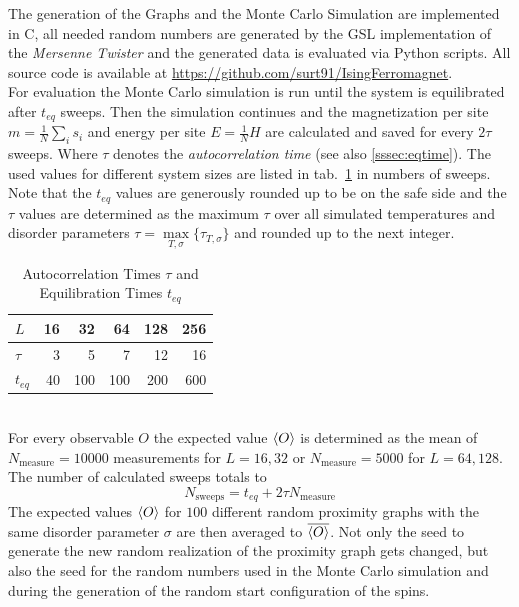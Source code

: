 The generation of the Graphs and the Monte Carlo Simulation are implemented
in C, all needed random numbers are generated by the GSL \cite{GSL}
implementation of the \emph{Mersenne Twister} \cite{Matsumoto1998} and
the generated data is evaluated via Python scripts.
All source code is available at \url{https://github.com/surt91/IsingFerromagnet}.\\

For evaluation the Monte Carlo simulation is run until the system
is equilibrated after \(t_{eq}\) sweeps. Then the simulation continues
and the magnetization per site \(m=\frac{1}{N}\sum_i s_i\) and energy
per site \(E=\frac{1}{N} H\) are calculated and saved for every
\(2\tau\) sweeps. Where \(\tau\) denotes the \emph{autocorrelation time}
(see also \ref{sssec:eqtime}). The used values for different system sizes
are listed in tab.\ \ref{tab:tauAndTeq} in numbers of sweeps. Note that
the \(t_{eq}\) values are generously rounded up to be on the safe side
and the \(\tau\) values are determined as the maximum \(\tau\) over all
simulated temperatures and disorder parameters \(\tau = \underset{T,\sigma}{\max} \{\tau_{T,\sigma}\}\)
and rounded up to the next integer.
\begin{table}[htbp]
    \center
    \begin{tabular}{l r r r r r}
        \toprule
        \(L\)    & 16 &  32 &  64 & 128 & 256\\
        \midrule
        \(\tau\) &  3 &   5 &   7 &  12 &  16\\
        \(t_{eq}\) & 40 & 100 & 100 & 200 & 600\\
        \bottomrule
    \end{tabular}
    \caption{Autocorrelation Times $\tau$ and Equilibration Times $t_{eq}$}
    \label{tab:tauAndTeq}
\end{table}\\
For every observable \(O\) the expected value \(\left< O \right>\) is determined
as the mean of \(N_{\mathrm{measure}}=10000\) measurements for \(L=16,32\)
or \(N_{\mathrm{measure}}=5000\) for \(L=64,128\). The number of
calculated sweeps totals to
\[N_{\mathrm{sweeps}}=t_{eq}+2\tau N_{\mathrm{measure}}\]
The expected values \(\left< O \right>\) for \(100\) different random proximity
graphs with the same disorder parameter \(\sigma\) are then averaged to
\(\overline{\left< O \right>}\). Not only the seed to generate the new random
realization of the proximity graph gets changed, but also the seed for
the random numbers used in the Monte Carlo simulation and during the
generation of the random start configuration of the spins.\\
